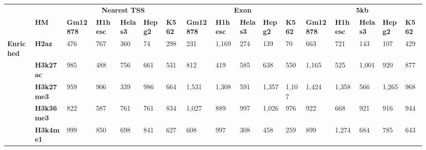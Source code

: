 \newpage

\begin{sidewaystable}[!ht]
\tiny
\centering
\begin{tabular}{ll|lllll|lllll|lllll}
\multicolumn{2}{l}{\textbf{}}         & \multicolumn{5}{c}{\textbf{Nearest TSS}}                                              & \multicolumn{5}{c}{\textbf{Exon}}                                                     & \multicolumn{5}{c}{\textbf{5kb}}                                                      \\
\textbf{}         & \textbf{HM}       & \textbf{Gm12878} & \textbf{H1hesc} & \textbf{Helas3} & \textbf{Hepg2} & \textbf{K562} & \textbf{Gm12878} & \textbf{H1hesc} & \textbf{Helas3} & \textbf{Hepg2} & \textbf{K562} & \textbf{Gm12878} & \textbf{H1hesc} & \textbf{Helas3} & \textbf{Hepg2} & \textbf{K562} \\\hline
\textbf{Enriched} & \textbf{H2az}     & 476              & 767             & 360             & 74             & 298           & 231              & 1,169           & 274             & 139            & 70            & 663              & 721             & 143             & 107            & 429           \\
                  & \textbf{H3k27ac}  & 985              & 488             & 756             & 661            & 531           & 812              & 419             & 585             & 638            & 550           & 1,165            & 525             & 1,001           & 920            & 877           \\
                  & \textbf{H3k27me3} & 959              & 906             & 339             & 986            & 664           & 1,531            & 1,308           & 591             & 1,357          & 1,107         & 1,424            & 1,358           & 566             & 1,265          & 968           \\
                  & \textbf{H3k36me3} & 822              & 587             & 761             & 761            & 834           & 1,027            & 889             & 997             & 1,026          & 976           & 922              & 668             & 921             & 916            & 944           \\
                  & \textbf{H3k4me1}  & 999              & 850             & 698             & 841            & 627           & 608              & 997             & 308             & 458            & 259           & 899              & 1,274           & 684             & 785            & 643           \\

\end{tabular}
\end{sidewaystable}
